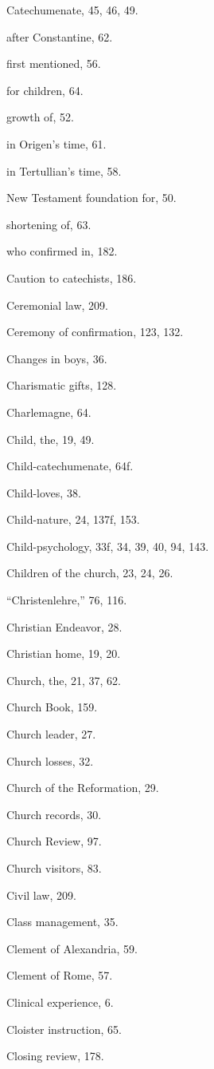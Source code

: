 \begin{originalinhalt}
Catechumenate, 45, 46, 49.

after Constantine, 62.

first mentioned, 56.

for children, 64.

growth of, 52.

in Origen’s time, 61.

in Tertullian’s time, 58.

New Testament foundation for, 50.

shortening of, 63.

who confirmed in, 182.

Caution to catechists, 186.

Ceremonial law, 209.

Ceremony of confirmation, 123, 132.

Changes in boys, 36.

Charismatic gifts, 128.

Charlemagne, 64.

Child, the, 19, 49.

Child-catechumenate, 64f.

Child-loves, 38.

Child-nature, 24, 137f, 153.

Child-psychology, 33f, 34, 39, 40, 94, 143.

Children of the church, 23, 24, 26.

“Christenlehre,” 76, 116.

Christian Endeavor, 28.

Christian home, 19, 20.

Church, the, 21, 37, 62.

Church Book, 159.

Church leader, 27.

Church losses, 32.

Church of the Reformation, 29.

Church records, 30.

Church Review, 97.

Church visitors, 83.

Civil law, 209.

Class management, 35.

Clement of Alexandria, 59.

Clement of Rome, 57.

Clinical experience, 6.

Cloister instruction, 65.

Closing review, 178.


\end{originalinhalt}

